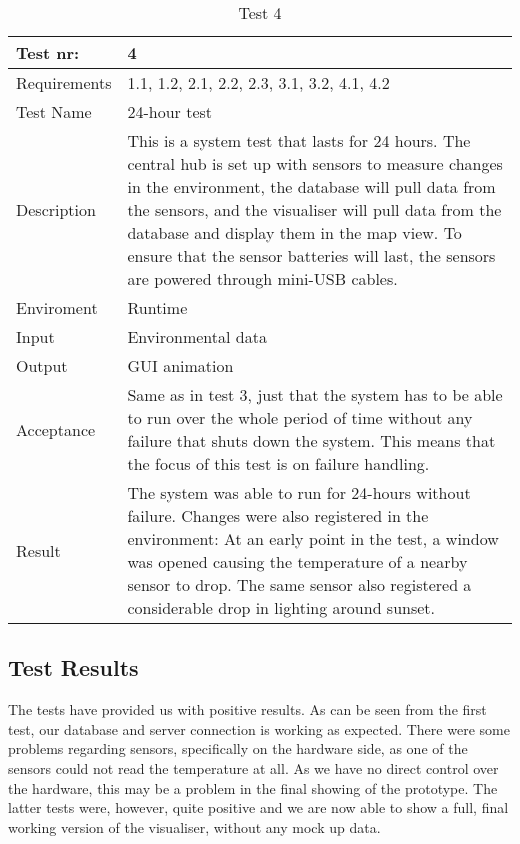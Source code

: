 \documentclass[../document]{subfiles}
\begin{document}
\begin{table}[H]
\caption{Test 4}
\centering
\begin{tabularx}{\textwidth}{|l|X|}
    \hline
	Test nr:
	&4
    \\ \hline Requirements
	&1.1, 1.2, 2.1, 2.2, 2.3, 3.1, 3.2, 4.1, 4.2
    \\ \hline Test Name
    &24-hour test
    \\ \hline Description
    &This is a system test that lasts for 24 hours. The central hub is set up with sensors to measure changes in the environment, the database will pull data from the sensors, and the visualiser will pull data from the database and display them in the map view. To ensure that the sensor batteries will last, the sensors are powered through mini-USB cables.
    \\ \hline Enviroment
    &Runtime
    \\ \hline Input
    &Environmental data
    \\ \hline Output
    &GUI animation
    \\ \hline Acceptance
    &Same as in test 3, just that the system has to be able to run over the whole period of time without any failure that shuts down the system. This means that the focus of this test is on failure handling.
	\\ \hline Result
	&The system was able to run for 24-hours without failure. Changes were also registered in the environment: At an early point in the test, a window was opened causing the temperature of a nearby sensor to drop. The same sensor also registered a considerable drop in lighting around sunset.
    \\ \hline
\end{tabularx}
\end{table}

\subsection{Test Results}
The tests have provided us with positive results. As can be seen from the first test, our database and server connection is working as expected. There were some problems regarding sensors, specifically on the hardware side, as one of the sensors could not read the temperature at all. As we have no direct control over the hardware, this may be a problem in the final showing of the prototype. The latter tests were, however, quite positive and we are now able to show a full, final working version of the visualiser, without any mock up data.
\end{document}
